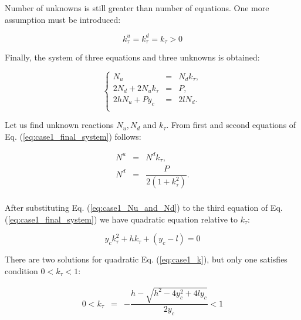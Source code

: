 \documentclass{ws-procs9x6}
\begin{document}
Number of unknowns is still greater than number of equations. One more assumption must be introduced:

\begin{equation}
  \label{eq:case1_assumption_3}
  k_\tau^u = k_\tau^d = k_\tau > 0
\end{equation}

Finally, the system of three equations and three unknowns is obtained:

\begin{equation}
\label{eq:case1_final_system}
\left\{
\begin{array}{rcl}
  N_u &=& N_dk_\tau,\\  
  2N_d + 2N_uk_\tau &=& P,\\
  2hN_u + Py_c &=& 2lN_d.\\
\end{array}
\right.
\end{equation}

Let us find unknown reactions $N_u,N_d$ and $k_\tau$. From first and second equations of Eq. (\ref{eq:case1_final_system}) follows:

\begin{equation}
\label{eq:case1_Nu_and_Nd}
\begin{array}{rcl}
  N^u &=& N^dk_\tau,\\
  N^d &=& \dfrac{P}{2(1+k_\tau^2)}.\\
\end{array}
\end{equation}

After substituting Eq. (\ref{eq:case1_Nu_and_Nd}) to the third equation of Eq. (\ref{eq:case1_final_system}) we have quadratic equation relative to $k_\tau$:

\begin{equation}
\label{eq:case1_k}
y_ck_\tau^2+hk_\tau + (y_c-l) = 0
\end{equation}

There are two solutions for quadratic Eq. (\ref{eq:case1_k}), but only one satisfies condition $0<k_\tau<1$:

\begin{equation}
\label{eq:case1_k12}
\begin{array}{rcl}
 0 < k_\tau &=& -\dfrac{h - \sqrt{h^2 - 4y_c^2 + 4ly_c}}{2y_c} < 1\\
\end{array}
\end{equation}
\end{document}
